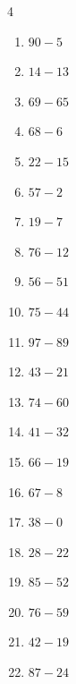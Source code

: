 \begin{multicols}{4}
\begin{enumerate}
\columnbreak %

  \item $90-5$
        \phantom{$=85$}

  \item $14-13$
        \phantom{$=1$}

  \item $69-65$
        \phantom{$=4$}

  \item $68-6$
        \phantom{$=62$}

  \item $22-15$
        \phantom{$=7$}

  \item $57-2$
        \phantom{$=55$}

  \item $19-7$
        \phantom{$=12$}

  \item $76-12$
        \phantom{$=64$}

  \item $56-51$
        \phantom{$=5$}

  \item $75-44$
        \phantom{$=31$}

  \item $97-89$
        \phantom{$=8$}

  \item $43-21$
        \phantom{$=22$}

  \item $74-60$
        \phantom{$=14$}

  \item $41-32$
        \phantom{$=9$}

  \item $66-19$
        \phantom{$=47$}

  \item $67-8$
        \phantom{$=59$}

  \item $38-0$
        \phantom{$=38$}

  \item $28-22$
        \phantom{$=6$}

  \item $85-52$
        \phantom{$=33$}

  \item $76-59$
        \phantom{$=17$}

  \item $42-19$
        \phantom{$=23$}

  \item $87-24$
        \phantom{$=63$}


\end{enumerate}
\end{multicols}
